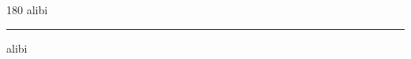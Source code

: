 
\begin{frame}
\begin{center}
\begin{turn}{180}
{\fontsize{2.5cm}{1em}\selectfont alibi}
\end{turn}
\vspace{1em}\par  
\hrule
\vspace{1em}\par  
{\fontsize{2.5cm}{1em}\selectfont alibi}
\end{center}
\end{frame}
